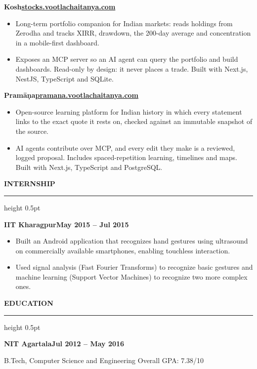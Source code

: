 \documentclass[10pt,letterpaper]{article}
\newcommand{\rsection}[1]{%
  \par\addvspace{11pt}%
  {\bfseries\MakeUppercase{#1}}\par\nobreak
  \vspace{2.5pt}\hrule height 0.5pt\nobreak\vspace{6pt}}
\newcommand{\entry}[3]{%
  \par\addvspace{7pt}%
  \textbf{#1}\hfill\textbf{#2}\par\nobreak
  \if\relax\detokenize{#3}\relax\else\textit{#3}\par\nobreak\fi}
\newcommand{\Pramana}{Pram\=a\d{n}a}
\begin{document}
\entry{Kosh}{\href{https://stocks.vootlachaitanya.com}{stocks.vootlachaitanya.com}}{}
\begin{itemize}
  \item Long-term portfolio companion for Indian markets: reads holdings from Zerodha and tracks XIRR,
        drawdown, the 200-day average and concentration in a mobile-first dashboard.
  \item Exposes an MCP server so an AI agent can query the portfolio and build dashboards. Read-only
        by design: it never places a trade. Built with Next.js, NestJS, TypeScript and SQLite.
\end{itemize}

\entry{\Pramana}{\href{https://pramana.vootlachaitanya.com}{pramana.vootlachaitanya.com}}{}
\begin{itemize}
  \item Open-source learning platform for Indian history in which every statement links to the exact
        quote it rests on, checked against an immutable snapshot of the source.
  \item AI agents contribute over MCP, and every edit they make is a reviewed, logged proposal.
        Includes spaced-repetition learning, timelines and maps. Built with Next.js, TypeScript and
        PostgreSQL.
\end{itemize}


\rsection{Internship}

\entry{IIT Kharagpur}{May 2015 -- Jul 2015}{}
\begin{itemize}
  \item Built an Android application that recognizes hand gestures using ultrasound on commercially
        available smartphones, enabling touchless interaction.
  \item Used signal analysis (Fast Fourier Transforms) to recognize basic gestures and machine
        learning (Support Vector Machines) to recognize two more complex ones.
\end{itemize}


\rsection{Education}

\entry{NIT Agartala}{Jul 2012 -- May 2016}{}
B.Tech, Computer Science and Engineering \hfill Overall GPA: 7.38/10
\end{document}
